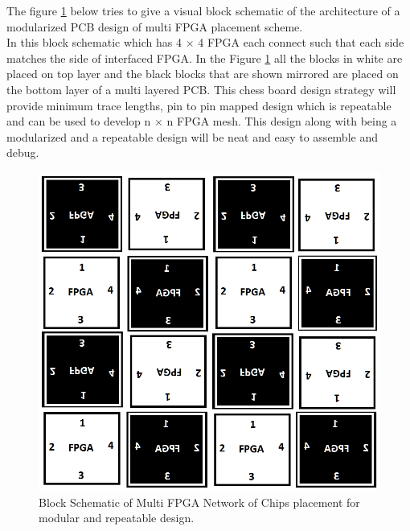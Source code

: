 The figure \ref{MultiFPGANoC} below tries to give a visual block schematic of the architecture of a modularized PCB design of multi FPGA placement scheme.\\

In this block schematic which has 4 $\times$ 4 FPGA each connect such that each side matches the side of interfaced FPGA. In the Figure \ref{MultiFPGANoC} all the blocks in white are placed on top layer and the black blocks that are shown mirrored are placed on the bottom layer of a multi layered PCB. This chess board design strategy will provide minimum trace lengths, pin to pin mapped design which is repeatable and can be used to develop n $\times$ n FPGA mesh.  This design along with being a modularized and a repeatable design will be neat and easy to assemble and debug. 


\begin{figure} [H]
  \centering
   \includegraphics[scale=0.5]{./figs/MultiFPGANoC}
  \caption{Block Schematic of Multi FPGA Network of Chips placement for modular and repeatable design.}
  \label{MultiFPGANoC}
\end{figure}

